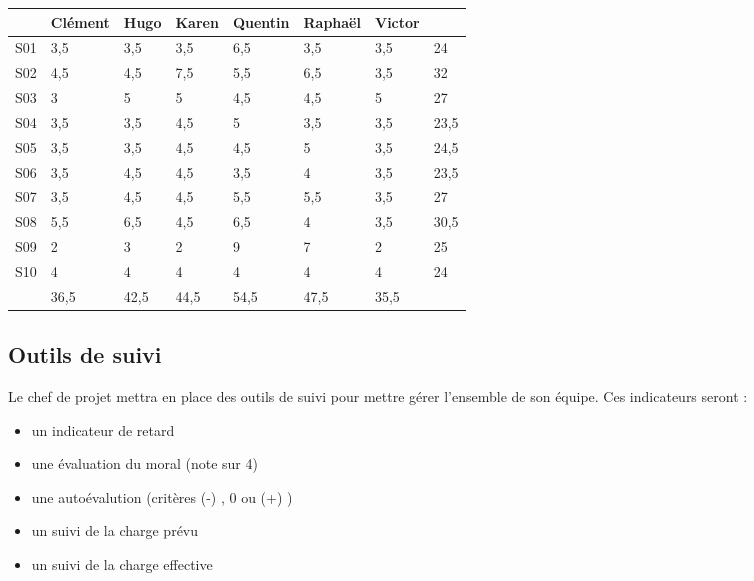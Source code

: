 \begin{tabular}{|l|l|l|l|l|l|l|l|}
\hline
&Clément&Hugo&Karen&Quentin&Raphaël&Victor&\\
\hline
S01&3,5&3,5&3,5&6,5&3,5&3,5&24\\
\hline
S02&4,5&4,5&7,5&5,5&6,5&3,5&32\\
\hline
S03&3&5&5&4,5&4,5&5&27\\
\hline
S04&3,5&3,5&4,5&5&3,5&3,5&23,5\\
\hline
S05&3,5&3,5&4,5&4,5&5&3,5&24,5\\
\hline
S06&3,5&4,5&4,5&3,5&4&3,5&23,5\\
\hline
S07&3,5&4,5&4,5&5,5&5,5&3,5&27\\
\hline
S08&5,5&6,5&4,5&6,5&4&3,5&30,5\\
\hline
S09&2&3&2&9&7&2&25\\
\hline
S10&4&4&4&4&4&4&24\\
\hline
&36,5&42,5&44,5&54,5&47,5&35,5&\\
\hline
\end{tabular}


\subsection{Outils de suivi}

Le chef de projet mettra en place des outils de suivi pour mettre gérer l'ensemble de son équipe. 
Ces indicateurs seront : 
\begin{itemize}
\item un indicateur de retard
\item une évaluation du moral (note sur 4)
\item une autoévalution (critères (-) , 0 ou (+) )
\item un suivi de la charge prévu
\item un suivi de la charge effective
\end{itemize}
